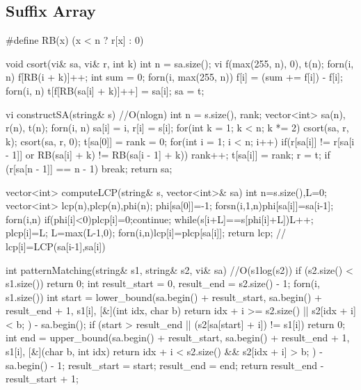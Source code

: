 \documentclass[10pt, landscape, twocolumn, a4paper, notitlepage]{article}
\begin{document}
\subsection{Suffix Array}
\begin{code}
#define RB(x) (x < n ? r[x] : 0)
 
void csort(vi& sa, vi& r, int k) {
    int n = sa.size();
    vi f(max(255, n), 0), t(n);
    forn(i, n) f[RB(i + k)]++;
    int sum  = 0;
    forn(i, max(255, n)) f[i] = (sum += f[i]) - f[i];
    forn(i, n) t[f[RB(sa[i] + k)]++] = sa[i];
    sa = t;
}
 
vi constructSA(string& s) { //O(nlogn)
    int n = s.size(), rank;
    vector<int> sa(n), r(n), t(n);
    forn(i, n) sa[i] = i, r[i] = s[i];
    for(int k = 1; k < n; k *= 2) {
        csort(sa, r, k); csort(sa, r, 0);
        t[sa[0]] = rank = 0;
        for(int i = 1; i < n; i++) {
            if(r[sa[i]] != r[sa[i - 1]] or RB(sa[i] + k) != RB(sa[i - 1] + k)) rank++;
            t[sa[i]] = rank;
        }
        r = t;
        if (r[sa[n - 1]] == n - 1) break;
    }
    return sa;
}

vector<int> computeLCP(string& s, vector<int>& sa){
	int n=s.size(),L=0;
	vector<int> lcp(n),plcp(n),phi(n);
	phi[sa[0]]=-1;
	forsn(i,1,n)phi[sa[i]]=sa[i-1];
	forn(i,n){
		if(phi[i]<0){plcp[i]=0;continue;}
		while(s[i+L]==s[phi[i]+L])L++;
		plcp[i]=L;
		L=max(L-1,0);
	}
	forn(i,n)lcp[i]=plcp[sa[i]];
	return lcp; // lcp[i]=LCP(sa[i-1],sa[i])
}
 
int patternMatching(string& s1, string& s2, vi& sa) { //O(s1log(s2))
    if (s2.size() < s1.size()) {
        return 0;
    }
    int result_start = 0, result_end = s2.size() - 1;
    forn(i, s1.size()) {
        int start = lower_bound(sa.begin() + result_start, sa.begin() + result_end + 1, s1[i], [&](int idx, char b) {
            return idx + i >= s2.size() || s2[idx + i] < b;
        }) - sa.begin();
        if (start > result_end || (s2[sa[start] + i]) != s1[i]) {
            return 0;
        }
        int end = upper_bound(sa.begin() + result_start, sa.begin() + result_end + 1, s1[i], [&](char b, int idx) {
            return idx + i < s2.size() && s2[idx + i] > b;
        }) - sa.begin() - 1;
        result_start = start;
        result_end = end;
    }
    return result_end - result_start + 1;
}
\end{code}
\end{document}
